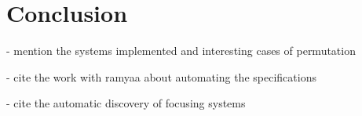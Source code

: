 \documentclass{llncs}
\begin{document}

\section{Conclusion}
\label{sec:conclusion}

- mention the systems implemented and interesting cases of permutation

- cite the work with ramyaa about automating the specifications

- cite the automatic discovery of focusing systems
\end{document}
